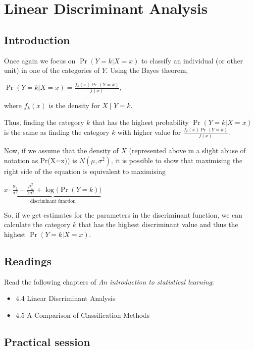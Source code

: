\documentclass[
]{book}
\providecommand{\tightlist}{%
  \setlength{\itemsep}{0pt}\setlength{\parskip}{0pt}}
\begin{document}
\chapter{Linear Discriminant Analysis}\label{linear-discriminant-analysis}

\section{Introduction}\label{lda.intro}

Once again we focus on \(\Pr (Y=k | X = x)\) to classify an individual (or other
unit) in one of the categories of \(Y\). Using the Bayes theorem,

\(\Pr (Y=k | X = x) = \frac{f_k(x) \Pr (Y=k) }{f(x)}\),

where \(f_k(x)\) is the density for \(X\mid Y=k\).

Thus, finding the category \(k\) that has the highest probability
\(\Pr (Y=k | X = x)\) is the same as finding the category \(k\) with higher value
for \(\frac{f_k(x)\Pr(Y=k) }{f(x)}\).

Now, if we assume that the density of \(X\) (represented above in a slight abuse
of notation as Pr(X=x)) is \(N(\mu, \sigma^2)\), it is possible to show that
maximising the right side of the equation is equivalent to maximising

\(\underbrace{x \cdot \frac{\mu_k}{\sigma^2} - \frac{\mu_k^2}{2\sigma^2} + \log\big(\Pr(Y=k)\big)}_{\text{discriminant function}}\)

So, if we get estimates for the parameters in the discriminant function,
we can calculate the category \(k\) that has the highest discriminant value and
thus the highest \(\Pr (Y=k | X = x)\).

\section{Readings}\label{lda.read}

Read the following chapters of \emph{An introduction to statistical learning}:

\begin{itemize}
\tightlist
\item
  4.4 Linear Discriminant Analysis
\item
  4.5 A Comparison of Classification Methods
\end{itemize}

\section{Practical session}\label{lda.prac}
\end{document}
